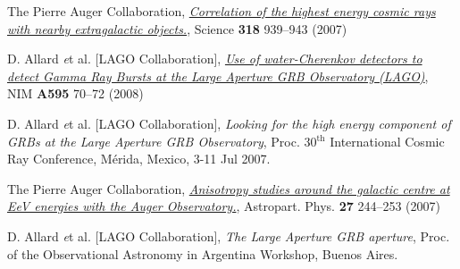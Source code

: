 \begin{etaremune}
\item {}The Pierre Auger Collaboration,
\href{http://dx.doi.org/10.1126/science.1151124}{\emph{Correlation of the
highest energy cosmic rays with nearby extragalactic objects.}}, Science {\bf
318} 939--943 (2007)

\item {}D. Allard {\emph et al.} [LAGO Collaboration],
\href{http://dx.doi.org/10.1016/j.nima.2008.07.041}{\emph{Use of
water-Cherenkov detectors to detect Gamma Ray Bursts at the Large Aperture GRB
Observatory (LAGO)}}, NIM {\bf A595} 70--72 (2008)

\item {}D. Allard {\emph et al.} [LAGO Collaboration], {\emph{Looking for
the high energy component of GRBs at the Large Aperture GRB Observatory}}, \en
Proc. 30$^{\mathrm{th}}$ International Cosmic Ray Conference,  Mérida, Mexico, 3-11 Jul
2007.

\item {}The Pierre Auger Collaboration,
\href{http://dx.doi.org/10.1016/j.astropartphys.2006.11.002}{\emph{Anisotropy
studies around the galactic centre at EeV energies with the Auger
Observatory.}},  Astropart. Phys. {\bf 27} 244--253 (2007)

\item {}D. Allard {\emph et al.} [LAGO Collaboration], {\emph{The Large
Aperture GRB aperture}}, \en Proc. of the Observational Astronomy in Argentina
Workshop, Buenos Aires.

\end{etaremune}
